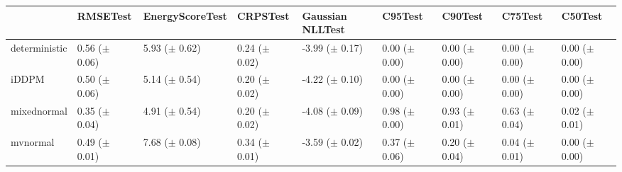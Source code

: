 \begin{tabular}{lllllllll}
\toprule
 & RMSETest & EnergyScoreTest & CRPSTest & Gaussian NLLTest & C95Test & C90Test & C75Test & C50Test \\
\midrule
deterministic & \makecell{0.56 \\ ($\pm$ 0.06)} & \makecell{5.93 \\ ($\pm$ 0.62)} & \makecell{0.24 \\ ($\pm$ 0.02)} & \makecell{-3.99 \\ ($\pm$ 0.17)} & \makecell{0.00 \\ ($\pm$ 0.00)} & \makecell{0.00 \\ ($\pm$ 0.00)} & \makecell{0.00 \\ ($\pm$ 0.00)} & \makecell{0.00 \\ ($\pm$ 0.00)} \\
iDDPM & \makecell{0.50 \\ ($\pm$ 0.06)} & \makecell{5.14 \\ ($\pm$ 0.54)} & \makecell{0.20 \\ ($\pm$ 0.02)} & \makecell{-4.22 \\ ($\pm$ 0.10)} & \makecell{0.00 \\ ($\pm$ 0.00)} & \makecell{0.00 \\ ($\pm$ 0.00)} & \makecell{0.00 \\ ($\pm$ 0.00)} & \makecell{0.00 \\ ($\pm$ 0.00)} \\
mixednormal & \makecell{0.35 \\ ($\pm$ 0.04)} & \makecell{4.91 \\ ($\pm$ 0.54)} & \makecell{0.20 \\ ($\pm$ 0.02)} & \makecell{-4.08 \\ ($\pm$ 0.09)} & \makecell{0.98 \\ ($\pm$ 0.00)} & \makecell{0.93 \\ ($\pm$ 0.01)} & \makecell{0.63 \\ ($\pm$ 0.04)} & \makecell{0.02 \\ ($\pm$ 0.01)} \\
mvnormal & \makecell{0.49 \\ ($\pm$ 0.01)} & \makecell{7.68 \\ ($\pm$ 0.08)} & \makecell{0.34 \\ ($\pm$ 0.01)} & \makecell{-3.59 \\ ($\pm$ 0.02)} & \makecell{0.37 \\ ($\pm$ 0.06)} & \makecell{0.20 \\ ($\pm$ 0.04)} & \makecell{0.04 \\ ($\pm$ 0.01)} & \makecell{0.00 \\ ($\pm$ 0.00)} \\

\end{tabular}
